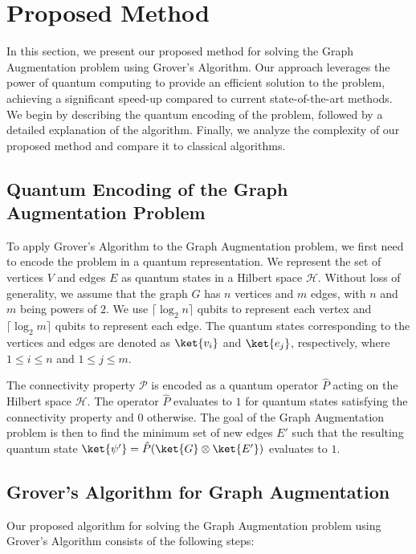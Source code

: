 \section{Proposed Method}
\label{sec:proposed_method}

In this section, we present our proposed method for solving the Graph Augmentation problem using Grover's Algorithm. Our approach leverages the power of quantum computing to provide an efficient solution to the problem, achieving a significant speed-up compared to current state-of-the-art methods. We begin by describing the quantum encoding of the problem, followed by a detailed explanation of the algorithm. Finally, we analyze the complexity of our proposed method and compare it to classical algorithms.

\subsection{Quantum Encoding of the Graph Augmentation Problem}
\label{subsec:quantum_encoding}

To apply Grover's Algorithm to the Graph Augmentation problem, we first need to encode the problem in a quantum representation. We represent the set of vertices $V$ and edges $E$ as quantum states in a Hilbert space $\mathcal{H}$. Without loss of generality, we assume that the graph $G$ has $n$ vertices and $m$ edges, with $n$ and $m$ being powers of $2$. We use $\lceil\log_2{n}\rceil$ qubits to represent each vertex and $\lceil\log_2{m}\rceil$ qubits to represent each edge. The quantum states corresponding to the vertices and edges are denoted as $\ket{v_i}$ and $\ket{e_j}$, respectively, where $1 \leq i \leq n$ and $1 \leq j \leq m$.

The connectivity property $\mathcal{P}$ is encoded as a quantum operator $\hat{P}$ acting on the Hilbert space $\mathcal{H}$. The operator $\hat{P}$ evaluates to $1$ for quantum states satisfying the connectivity property and $0$ otherwise. The goal of the Graph Augmentation problem is then to find the minimum set of new edges $E'$ such that the resulting quantum state $\ket{\psi'} = \hat{P}(\ket{G} \otimes \ket{E'})$ evaluates to $1$.

\subsection{Grover's Algorithm for Graph Augmentation}
\label{subsec:grover_algorithm_graph_augmentation}

Our proposed algorithm for solving the Graph Augmentation problem using Grover's Algorithm consists of the following steps:


